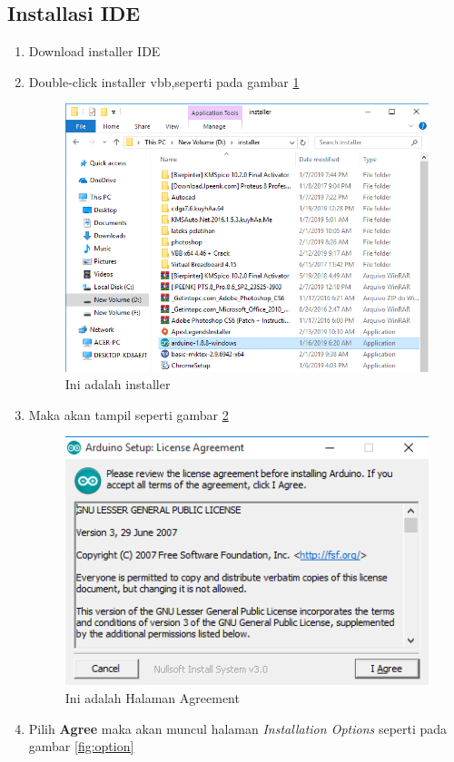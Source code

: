 \subsection{Installasi IDE} 
\begin{enumerate}
        \item Download installer IDE
        \item Double-click installer vbb,seperti pada gambar \ref{fig:installer}
            \begin{figure}[!htbp]
            \centering
            \includegraphics[width=.75\textwidth]{figures/IDE/installer.png}
            \caption{Ini adalah installer}\label{fig:installer}
            \end{figure}
        \item Maka akan tampil seperti gambar \ref{fig:agreement}
            \begin{figure}[!htbp]
            \centering
            \includegraphics[width=.75\textwidth]{figures/IDE/agreement.png}
            \caption{Ini adalah Halaman Agreement}\label{fig:agreement}
            \end{figure}
        \item Pilih \textbf{Agree} maka akan muncul halaman \textit{Installation Options} seperti pada gambar \ref{fig:option}

\end{enumerate}
